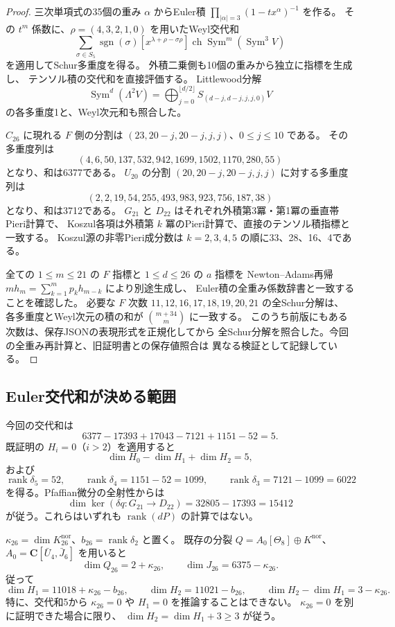 \documentclass[a4paper,11pt]{ltjsarticle}
\theoremstyle{definition}
\begin{document}
\begin{proof}
三次単項式の35個の重み $\alpha$ からEuler積
$\prod_{|\alpha|=3}(1-tx^\alpha)^{-1}$ を作る。
その $t^m$ 係数に、$\rho=(4,3,2,1,0)$ を用いたWeyl交代和
\[
 \sum_{\sigma\in S_5}\operatorname{sgn}(\sigma)
 [x^{\lambda+\rho-\sigma\rho}]
 \operatorname{ch}\operatorname{Sym}^m(\operatorname{Sym}^3V)
\]
を適用してSchur多重度を得る。
外積二乗側も10個の重みから独立に指標を生成し、
テンソル積の交代和を直接評価する。
Littlewood分解
\[
 \operatorname{Sym}^d(\Lambda^2V)
 =\bigoplus_{j=0}^{\lfloor d/2\rfloor}S_{(d-j,d-j,j,j,0)}V
\]
の各多重度1と、Weyl次元和も照合した。

$C_{26}$ に現れる $F$ 側の分割は
$(23,20-j,20-j,j,j)$、$0\leq j\leq10$ である。
その多重度列は
\[
 (4,6,50,137,532,942,1699,1502,1170,280,55)
\]
となり、和は6377である。
$U_{20}$ の分割 $(20,20-j,20-j,j,j)$ に対する多重度列は
\[
 (2,2,19,54,255,493,983,923,756,187,38)
\]
となり、和は3712である。
$G_{21}$ と $D_{22}$ はそれぞれ外積第3冪・第1冪の垂直帯Pieri計算で、
Koszul各項は外積第 $k$ 冪のPieri計算で、直接のテンソル積指標と一致する。
Koszul源の非零Pieri成分数は $k=2,3,4,5$ の順に33、28、16、4である。

全ての $1\leq m\leq21$ の $F$ 指標と $1\leq d\leq26$ の $a$ 指標を
Newton--Adams再帰 $m h_m=\sum_{k=1}^m p_kh_{m-k}$ により別途生成し、
Euler積の全重み係数辞書と一致することを確認した。
必要な $F$ 次数 $11,12,16,17,18,19,20,21$ の全Schur分解は、
各多重度とWeyl次元の積の和が $\binom{m+34}{m}$ に一致する。
このうち前版にもある次数は、保存JSONの表現形式を正規化してから
全Schur分解を照合した。今回の全重み再計算と、旧証明書との保存値照合は
異なる検証として記録している。
\end{proof}

\subsection{Euler交代和が決める範囲}

今回の交代和は
\[
 6377-17393+17043-7121+1151-52=5.
\]
既証明の $H_i=0$（$i>2$）を適用すると
\[
 \dim H_0-\dim H_1+\dim H_2=5,
\]
および
\[
 \operatorname{rank}\delta_5=52,\qquad
 \operatorname{rank}\delta_4=1151-52=1099,\qquad
 \operatorname{rank}\delta_3=7121-1099=6022
\]
を得る。Pfaffian微分の全射性からは
\[
 \dim\ker(\delta q:G_{21}\to D_{22})=32805-17393=15412
\]
が従う。これらはいずれも $\operatorname{rank}(dP)$ の計算ではない。

$\kappa_{26}=\dim K^{\mathrm{nor}}_{26}$、$b_{26}=\operatorname{rank}\delta_2$ と置く。
既存の分裂
$Q=A_0[\Theta_8]\oplus K^{\mathrm{nor}}$、
$A_0=\mathbf C[\bar U_4,\bar J_6]$ を用いると
\[
 \dim Q_{26}=2+\kappa_{26},\qquad
 \dim J_{26}=6375-\kappa_{26}.
\]
従って
\[
 \dim H_1=11018+\kappa_{26}-b_{26},\qquad
 \dim H_2=11021-b_{26},\qquad
 \dim H_2-\dim H_1=3-\kappa_{26}.
\]
特に、交代和5から $\kappa_{26}=0$ や $H_1=0$ を推論することはできない。
$\kappa_{26}=0$ を別に証明できた場合に限り、
$\dim H_2=\dim H_1+3\geq3$ が従う。
\end{document}
